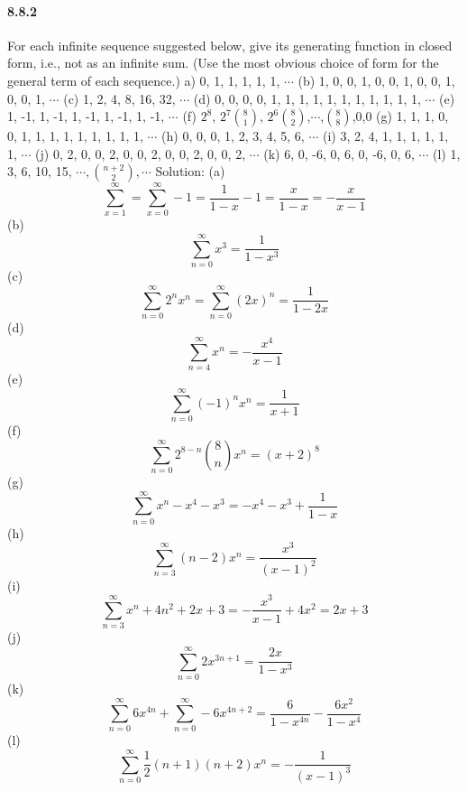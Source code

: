 \documentclass{article}
\begin{document}
\paragraph{8.8.2}
For each infinite sequence suggested below, give its generating function in closed
form, i.e., not as an infinite sum. (Use the most obvious choice of form for the general
term of each sequence.)
\newline
a) 0, 1, 1, 1, 1, 1, $\cdots$\newline
(b) 1, 0, 0, 1, 0, 0, 1, 0, 0, 1, 0, 0, 1, $\cdots$\newline
(c) 1, 2, 4, 8, 16, 32, $\cdots$\newline
(d) 0, 0, 0, 0, 1, 1, 1, 1, 1, 1, 1, 1, 1, 1, 1, $\cdots$\newline
(e) 1, -1, 1, -1, 1, -1, 1, -1, 1, -1, $\cdots$\newline
(f) $2^8$, $2^7\binom{8}{1}$, $2^6\binom{8}{2}$,$\cdots$,$\binom{8}{8}$,0,0\newline
(g) 1, 1, 1, 0, 0, 1, 1, 1, 1, 1, 1, 1, 1, 1, $\cdots$\newline
(h) 0, 0, 0, 1, 2, 3, 4, 5, 6, $\cdots$\newline
(i) 3, 2, 4, 1, 1, 1, 1, 1, 1, $\cdots$\newline
(j) 0, 2, 0, 0, 2, 0, 0, 2, 0, 0, 2, 0, 0, 2, $\cdots$\newline
(k) 6, 0, -6, 0, 6, 0, -6, 0, 6, $\cdots$\newline
(l) 1, 3, 6, 10, 15, $\cdots, \binom{n+2}{2},\cdots$\newline
Solution:\newline
(a)$$\sum_{x=1}^{\infty}=\sum_{x=0}^{\infty}-1=\frac{1}{1-x}-1=\frac{x}{1-x}=-\frac{x}{x-1}$$
(b)$$
\sum_{n=0}^{\infty}x^3=\frac{1}{1-x^3}$$
(c)$$
\sum_{n=0}^{\infty}2^nx^n=\sum_{n=0}^{\infty}(2x)^n=\frac{1}{1-2x}$$
(d)$$\sum_{n=4}^{\infty}x^n=-\frac{x^4}{x-1}$$
(e)$$
\sum_{n=0}^{\infty}(-1)^nx^n=\frac{1}{x+1}$$
(f)$$
\sum_{n=0}^{\infty}2^{8-n}\binom{8}{n}x^n=(x+2)^8$$
(g)$$
\sum_{n=0}^{\infty}x^n-x^4-x^3=-x^4-x^3+\frac{1}{1-x}$$
(h)$$\sum_{n=3}^{\infty}(n-2)x^n=\frac{x^3}{(x-1)^2}$$
(i)$$
\sum_{n=3}^{\infty}x^n+4n^2+2x+3=-\frac{x^3}{x-1}+4x^2=2x+3$$
(j)$$
\sum_{n=0}^{\infty}2x^{3n+1}=\frac{2x}{1-x^3}$$
(k)$$
\sum_{n=0}^{\infty}6x^{4n}+\sum_{n=0}^{\infty}-6x^{4n+2}=\frac{6}{1-x^{4n}}-\frac{6x^2}{1-x^4}$$
(l)$$
\sum_{n=0}^{\infty}\frac{1}{2}(n+1)(n+2)x^n=-\frac{1}{(x-1)^3}$$
\end{document}
